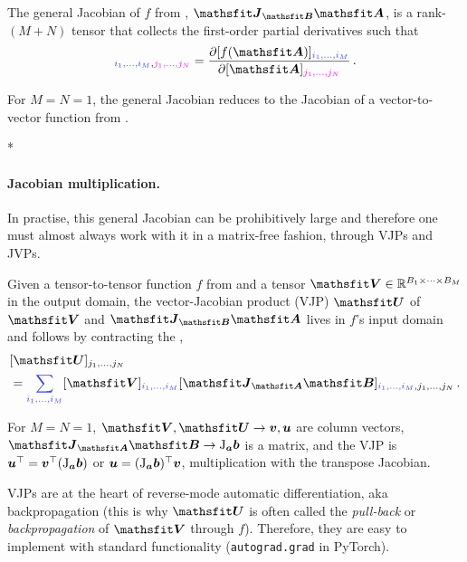 \begin{definition}\label{def:general_jacobian}
  The general Jacobian of $f$ from , $\tJ_{\tB}\tA$, is a rank-$(M+N)$ tensor that collects the first-order partial derivatives such that
  \begin{align*}
    [\tJ_{\tA}\tB]_{\colored{i_1, \dots, i_M}, \colored[VectorPink]{j_1, \dots, j_N}}
    =
    \frac{\partial [f(\tA)]_{\colored{i_1, \dots, i_M}}}{\partial [\tA]_{\colored[VectorPink]{j_1, \dots, j_N}}}\,.
  \end{align*}
\end{definition}
For $M=N=1$, the general Jacobian reduces to the Jacobian of a vector-to-vector function from .

\switchcolumn[1]*
\switchcolumn[0]

\paragraph{Jacobian multiplication.} In practise, this general Jacobian can be prohibitively large and therefore one must almost always work with it in a matrix-free fashion, \ie  through VJPs and JVPs.

\begin{definition}\label{def:vjp}
  Given a tensor-to-tensor function $f$ from  and a tensor $\tV \in \sR^{B_1 \times \dots \times B_M}$ in the output domain, the vector-Jacobian product (VJP) $\tU$ of $\tV$ and $\tJ_{\tB}\tA$ lives in $f$'s input domain and follows by contracting the ,
  \begin{align*}
    & [\tU]_{j_1, \dots, j_N}
    \\
    & =
      \colored{\sum_{i_1, \dots, i_M}}
      [\tV]_{\colored{i_1, \dots, i_M}}
      [\tJ_{\tA}\tB]_{\colored{i_1, \dots, i_M}, j_1, \dots, j_N}\,.
  \end{align*}
\end{definition}
For $M=N=1$, $\tV, \tU \to \vv, \vu$ are column vectors, $\tJ_{\tA}\tB \to \jac_{\va}\vb$ is a matrix, and the VJP is ${\bm{u}}^{\top} = {\bm{v}}^{\top} (\mathrm{J}_{{\bm{a}}}{\bm{b}})$ or ${\bm{u}} = (\mathrm{J}_{{\bm{a}}}{\bm{b}})^{\top} {\bm{v}}$, \ie multiplication with the transpose Jacobian.

VJPs are at the heart of reverse-mode automatic differentiation, aka backpropagation (this is why $\tU$ is often called the \emph{pull-back} or \emph{backpropagation} of $\tV$ through $f$).
Therefore, they are easy to implement with standard functionality (\eg \texttt{autograd.grad} in PyTorch).

